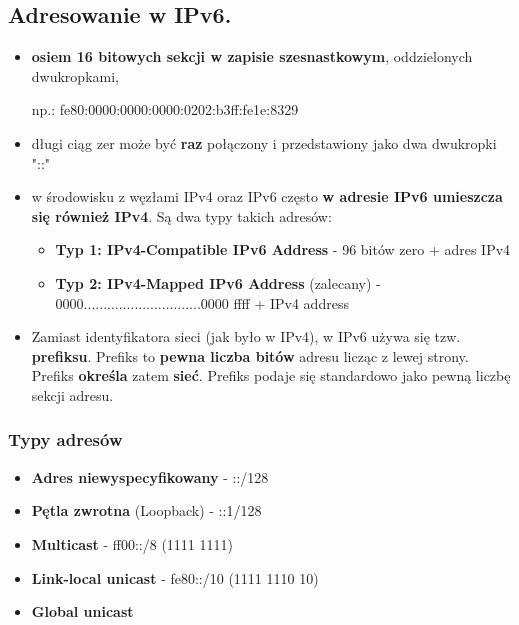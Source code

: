 \documentclass[12pt]{article}
\begin{document}
    \subsection{Adresowanie w IPv6.}

    \begin{itemize}
        \item \textbf{osiem 16 bitowych sekcji w zapisie szesnastkowym}, oddzielonych dwukropkami,

        np.: fe80:0000:0000:0000:0202:b3ff:fe1e:8329
        \item długi ciąg zer może być \textbf{raz} połączony i przedstawiony jako dwa dwukropki "::"
        \item w środowisku z węzłami IPv4 oraz IPv6 często \textbf{w adresie IPv6 umieszcza się również IPv4}. Są dwa typy takich adresów:
        \begin{itemize}
            \item \textbf{Typ 1: IPv4-Compatible IPv6 Address} - 96 bitów zero + adres IPv4
            \item \textbf{Typ 2: IPv4-Mapped IPv6 Address} (zalecany) - $0000..............................0000$ ffff + IPv4 address
        \end{itemize}
        \item Zamiast identyfikatora sieci (jak było w IPv4), w IPv6 używa się tzw. \textbf{prefiksu}. Prefiks to \textbf{pewna liczba bitów} adresu licząc z lewej strony. Prefiks \textbf{określa} zatem \textbf{sieć}. Prefiks podaje się standardowo jako pewną liczbę sekcji adresu.
    \end{itemize}

    \subsubsection{Typy adresów}
    \begin{itemize}
        \item \textbf{Adres niewyspecyfikowany} - ::/128
        \item \textbf{Pętla zwrotna} (Loopback) - ::1/128
        \item \textbf{Multicast} - ff00::/8 (1111 1111)
        \item \textbf{Link-local unicast} - fe80::/10 (1111 1110 10)
        \item \textbf{Global unicast}
    \end{itemize}
\end{document}
